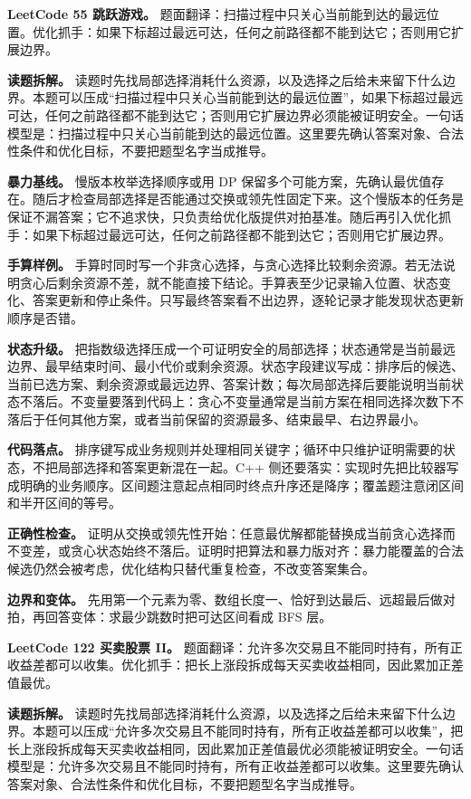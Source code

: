 \noindent\textbf{LeetCode 55 跳跃游戏。} 题面翻译：扫描过程中只关心当前能到达的最远位置。优化抓手：如果下标超过最远可达，任何之前路径都不能到达它；否则用它扩展边界。

\textbf{读题拆解。} 读题时先找局部选择消耗什么资源，以及选择之后给未来留下什么边界。本题可以压成“扫描过程中只关心当前能到达的最远位置”，如果下标超过最远可达，任何之前路径都不能到达它；否则用它扩展边界必须能被证明安全。一句话模型是：扫描过程中只关心当前能到达的最远位置。这里要先确认答案对象、合法性条件和优化目标，不要把题型名字当成推导。

\textbf{暴力基线。} 慢版本枚举选择顺序或用 DP 保留多个可能方案，先确认最优值存在。随后才检查局部选择是否能通过交换或领先性固定下来。这个慢版本的任务是保证不漏答案；它不追求快，只负责给优化版提供对拍基准。随后再引入优化抓手：如果下标超过最远可达，任何之前路径都不能到达它；否则用它扩展边界。

\textbf{手算样例。} 手算时同时写一个非贪心选择，与贪心选择比较剩余资源。若无法说明贪心后剩余资源不差，就不能直接下结论。手算表至少记录输入位置、状态变化、答案更新和停止条件。只写最终答案看不出边界，逐轮记录才能发现状态更新顺序是否错。

\textbf{状态升级。} 把指数级选择压成一个可证明安全的局部选择；状态通常是当前最远边界、最早结束时间、最小代价或剩余资源。状态字段建议写成：排序后的候选、当前已选方案、剩余资源或最远边界、答案计数；每次局部选择后要能说明当前状态不落后。不变量要落到代码上：贪心不变量通常是当前方案在相同选择次数下不落后于任何其他方案，或者当前保留的资源最多、结束最早、右边界最小。

\textbf{代码落点。} 排序键写成业务规则并处理相同关键字；循环中只维护证明需要的状态，不把局部选择和答案更新混在一起。C++ 侧还要落实：实现时先把比较器写成明确的业务顺序。区间题注意起点相同时终点升序还是降序；覆盖题注意闭区间和半开区间的等号。

\textbf{正确性检查。} 证明从交换或领先性开始：任意最优解都能替换成当前贪心选择而不变差，或贪心状态始终不落后。证明时把算法和暴力版对齐：暴力能覆盖的合法候选仍然会被考虑，优化结构只替代重复检查，不改变答案集合。

\textbf{边界和变体。} 先用第一个元素为零、数组长度一、恰好到达最后、远超最后做对拍，再回答变体：求最少跳数时把可达区间看成 BFS 层。

\noindent\textbf{LeetCode 122 买卖股票 II。} 题面翻译：允许多次交易且不能同时持有，所有正收益差都可以收集。优化抓手：把长上涨段拆成每天买卖收益相同，因此累加正差值最优。

\textbf{读题拆解。} 读题时先找局部选择消耗什么资源，以及选择之后给未来留下什么边界。本题可以压成“允许多次交易且不能同时持有，所有正收益差都可以收集”，把长上涨段拆成每天买卖收益相同，因此累加正差值最优必须能被证明安全。一句话模型是：允许多次交易且不能同时持有，所有正收益差都可以收集。这里要先确认答案对象、合法性条件和优化目标，不要把题型名字当成推导。

